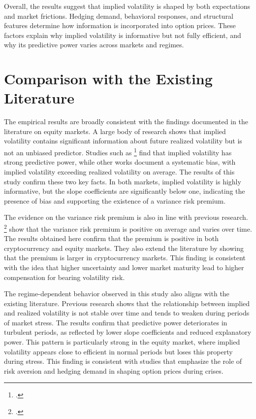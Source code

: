 \documentclass[11pt,a4paper,openany]{report}
\newcommand{\fcitet}[1]{\citet{#1}\footnote{\bibentry{#1}.}}
\begin{document}
Overall, the results suggest that implied volatility is shaped by both
expectations and market frictions. Hedging demand, behavioral responses,
and structural features determine how information is incorporated into
option prices. These factors explain why implied volatility is
informative but not fully efficient, and why its predictive power varies
across markets and regimes.

\section{Comparison with the Existing
Literature}\label{comparison-with-the-existing-literature}

The empirical results are broadly consistent with the findings
documented in the literature on equity markets. A large body of research
shows that implied volatility contains significant information about
future realized volatility but is not an unbiased predictor. Studies
such as \fcitet{christensen1998} find that implied volatility has strong predictive power,
while other works document a systematic bias, with implied volatility
exceeding realized volatility on average. The results of this study
confirm these two key facts. In both markets, implied volatility is
highly informative, but the slope coefficients are significantly below
one, indicating the presence of bias and supporting the existence of a
variance risk premium.

The evidence on the variance risk premium is also in line with previous
research. \fcitet{bollerslev2009} show that the variance risk premium is positive on average
and varies over time. The results obtained here confirm that the premium
is positive in both cryptocurrency and equity markets. They also extend
the literature by showing that the premium is larger in cryptocurrency
markets. This finding is consistent with the idea that higher
uncertainty and lower market maturity lead to higher compensation for
bearing volatility risk.

The regime-dependent behavior observed in this study also aligns with
the existing literature. Previous research shows that the relationship
between implied and realized volatility is not stable over time and
tends to weaken during periods of market stress. The results confirm
that predictive power deteriorates in turbulent periods, as reflected by
lower slope coefficients and reduced explanatory power. This pattern is
particularly strong in the equity market, where implied volatility
appears close to efficient in normal periods but loses this property
during stress. This finding is consistent with studies that emphasize
the role of risk aversion and hedging demand in shaping option prices
during crises.
\end{document}
